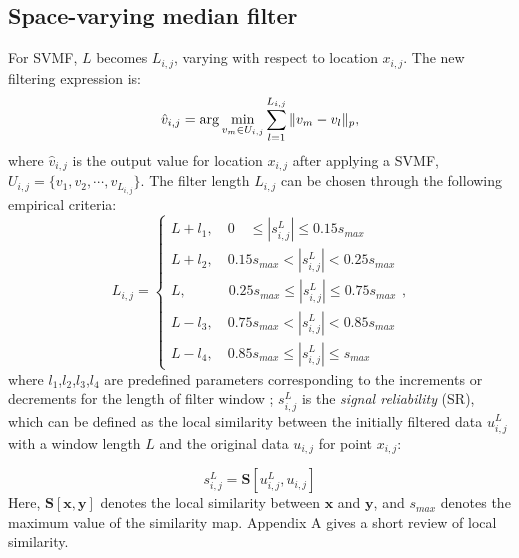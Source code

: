 \subsection{Space-varying median filter}
For SVMF, $L$ becomes $L_{i,j}$, varying with respect to location $x_{i,j}$. The new filtering expression is:
\begin{equation}
\label{eq:svmf1}
\hat{v}_{i,j} = \arg\min_{v_{m}\in U_{i,j} }\sum_{l=1}^{L_{i,j}} \Arrowvert v_{m} -v_l \Arrowvert_p,
\end{equation}
where $\hat{v}_{i,j}$ is the output value for location $x_{i,j}$ after applying a SVMF, $U_{i,j}=\{v_1,v_2,\cdots,v_{L_{i,j}}\}$. The filter length $L_{i,j}$ can be chosen through the following empirical criteria:
\begin{equation}
\label{eq:svmf2}
L_{i,j}=\left\{\begin{array}{ll}
L+l_1,\quad 0\quad \le |s^L_{i,j}|\le0.15s_{max} \\
L+l_2,\quad 0.15s_{max} < |s^L_{i,j}|<0.25s_{max} \\
L,\quad \quad\quad 0.25s_{max} \le |s^L_{i,j}|\le0.75s_{max} \\
L-l_3,\quad 0.75s_{max}<|s^L_{i,j}| < 0.85s_{max}\\
L-l_4,\quad 0.85s_{max}\le|s^L_{i,j}| \le s_{max}
\end{array}\right.,
\end{equation}
where $l_1$,$l_2$,$l_3$,$l_4$ are predefined parameters corresponding to the increments or decrements for the length of filter window ; $s^L_{i,j}$ is the \emph{signal reliability} (SR), which can be defined as the local similarity \cite[]{fomel2007localattr} between the initially filtered data $u^L_{i,j}$ with a window length $L$ and the original data $u_{i,j}$ for point $x_{i,j}$:

\begin{equation}
\label{eq:simi}
s^L_{i,j} = \mathbf{S} [u^L_{i,j}, u_{i,j}] 
\end{equation}
Here, $\mathbf{S} [\mathbf{x},\mathbf{y}]$ denotes the local similarity between $\mathbf{x}$ and $\mathbf{y}$, and $s_{max}$ denotes the maximum value of the similarity map. Appendix A gives a short review of local similarity.


